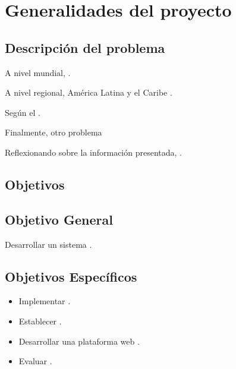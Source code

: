 \newpage
\section{Generalidades del proyecto}

\subsection{Descripción del problema}
A nivel mundial, .\hfill \break

A nivel regional, América Latina y el Caribe .\hfill \break

Según el .\hfill \break


Finalmente, otro problema 

Reflexionando sobre la información presentada, . \hfill \break


\subsection{Objetivos}
\subsection{Objetivo General}
Desarrollar un sistema .

\subsection{Objetivos Específicos}
 
\begin{itemize}
    \item Implementar .
    \item Establecer .
    
    \item Desarrollar una plataforma web .
    \item Evaluar .
\end{itemize}

